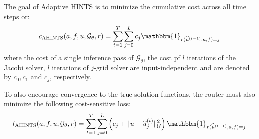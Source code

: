\documentclass[12pt]{article}
\begin{document}
The goal of Adaptive HINTS is to minimize the cumulative cost across all time steps or:
\begin{align*}
    c_{\text{AHINTS}}(a, f, u, \mathcal{G}_{\theta}, r) = \sum_{t = 1}^{T} \sum_{j = 0}^L c_j\mathbbm{1}_{r(\widehat{u}^{(t - 1)}, a, f)  = j}
\end{align*}
where the cost of a single inference pass of $\mathcal{G}_{\theta}$, the cost pf $l$ iterations of the Jacobi solver, $l$ iterations of $j$-grid solver are input-independent and are denoted by $c_0, c_1$ and $c_j$, respectively.


To also encourage convergence to the true solution functions, the router must also minimize the following cost-sensitive loss:
\begin{align*}
    l_{\text{AHINTS}}(a, f, u, \mathcal{G}_{\theta}, r) = \sum_{t = 1}^{T} \sum_{j = 0}^L \left(c_j +  \|u - \widehat{u}^{(t)}_j\|_{\mathcal{U}}^2\right)\mathbbm{1}_{r(\widehat{u}^{(t - 1)}, a, f)  = j}
\end{align*}


\end{document}
